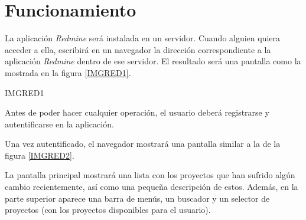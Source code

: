 \documentclass[11pt,a4paper,spanish,twoside]{report}
\begin{document}
\section{Funcionamiento}
La aplicación \emph{Redmine} será instalada en un servidor. Cuando alguien
quiera acceder a ella, escribirá en un navegador la dirección
correspondiente a la aplicación \emph{Redmine} dentro de ese servidor. El
resultado será una pantalla como la mostrada en la figura \ref{IMGRED1}.
		
{IMGRED1}

Antes de poder hacer cualquier operación, el usuario deberá registrarse y
autentificarse en la aplicación.

Una vez autentificado, el navegador mostrará una pantalla similar a la de la
figura \ref{IMGRED2}.


La pantalla principal mostrará una lista con los proyectos que han sufrido
algún cambio recientemente, así como una pequeña descripción de estos. Además,
en la parte superior aparece una barra de menús, un buscador y un selector
de proyectos (con los proyectos disponibles para el usuario).
\end{document}
